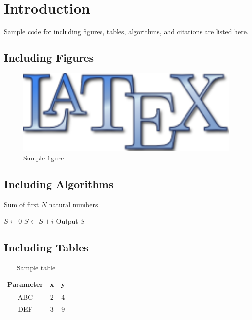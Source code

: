 \chapter{Introduction}\label{ch:introduction}

Sample code for including figures, tables, algorithms, and citations are listed here. 

\section{Including Figures}\label{sec:figures}
\begin{figure}[h]
	\centering
	\includegraphics[scale=0.15]{figures/latexlogo.pdf}
	\caption{Sample figure}
	\label{fig:latexlogo}
\end{figure}

\section{Including Algorithms}\label{sec:algorithms}
\begin{algorithm}[h]
	\caption{Sum of first $N$ natural numbers}
	\begin{algorithmic}[1]
		\State $S \leftarrow 0$
			\State $ S \leftarrow S + i $
		\EndFor{}
		\State Output $S$
	\end{algorithmic}
	\label{alg:sum}
\end{algorithm}

\section{Including Tables}\label{sec:tables}
\begin{table}[H]
	\centering
	\caption{Sample table}
	\begin{tabular}{| c | c | c |}\hline
	\textbf{Parameter} & \textbf{x} & \textbf{y} \\\hline\hline
	ABC & 2 & 4 \\\hline
	DEF & 3 & 9 \\\hline	
	\end{tabular}
\end{table}

